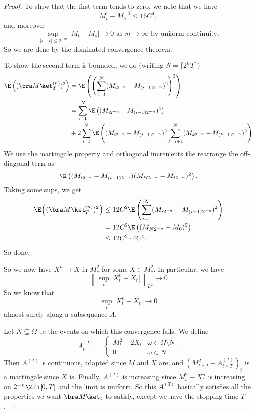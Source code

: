 \documentclass[a4paper]{article}
\begin{document}
\begin{proof}
  To show that the first term tends to zero, we note that we have
  \[
    M_t - M_s|^4 \leq 16 C^4,
  \]
  and moreover
  \[
    \sup_{|s - t| \leq 2^{-m}} |M_t - M_s| \to 0\text{ as }m \to \infty\text{ by uniform continuity}.
  \]
  So we are done by the dominated convergence theorem.

  To show the second term is bounded, we do (writing $N = \lceil 2^n T\rceil$)
  \begin{align*}
    \E\left((\bra M\ket_T^{(n)})^2\right) &= \E \left(\left(\sum_{i = 1}^{N} (M_{i 2^{-n}} - M_{(i - 1)2^{-n}})^2 \right)^2\right)\\
    &= \sum_{i = 1}^N \E \left( (M_{i 2^{-n}}- M_{(i - 1)2^{-n}})^4\right) \\
    &+ 2 \sum_{i = 1}^N\E \left((M_{i 2^{-n}} - M_{(i - 1)2^{-n}})^2 \sum_{k = i + 1}^N (M_{k2^{-n}} - M_{(k - 1)2^{-n}})^2\right)
  \end{align*}
  We use the martingale property and orthogonal increments the rearrange the off-diagonal term as
  \[
    \E\left((M_{i2^{-n}} - M_{(i - 1)2^{-n}})(M_{N2^{-n}} - M_{i 2^{-n}})^2\right).
  \]
  Taking some sups, we get
  \begin{align*}
    \E\left((\bra M\ket_T^{(n)})^2\right) &\leq 12 C^2 \E \left(\sum_{i = 1}^N (M_{i 2^{-n}} - M_{(i - 1)2^{-n}})^2\right)\\
    &= 12C^2 \E \left((M_{N 2^{-n}} - M_0)^2\right)\\
    &\leq 12 C^2 \cdot 4 C^2.
  \end{align*}
  So done.

  So we now have $X^n \to X$ in $M^2_c$ for some $X \in M_c^2$. In particular, we have
  \[
    \left\|\sup_t |X_t^n - X_t|\right\|_{L^2} \to 0
  \]
  So we know that
  \[
    \sup_t |X_t^n - X_t| \to 0
  \]
  almost surely along a subsequence $\Lambda$.

  Let $N \subseteq \Omega$ be the events on which this convergence fails. We define
  \[
    A_t^{(T)} =
    \begin{cases}
      M_t^2 - 2X_t& \omega \in \Omega \setminus N\\
      0 & \omega \in N
    \end{cases}.
  \]
  Then $A^{(T)}$ is continuous, adapted since $M$ and $X$ are, and $(M_{t \wedge T}^2 - A^{(T)}_{t \wedge T})_t$ is a martingale since $X$ is. Finally, $A^{(T)}$ is increasing since $M_t^2 - X_t^n$ is increasing on $2^{-n} \Z \cap [0, T]$ and the limit is uniform. So this $A^{(T)}$ basically satisfies all the properties we want $\bra M\ket_t$ to satisfy, except we have the stopping time $T$.


\end{proof}
\end{document}
